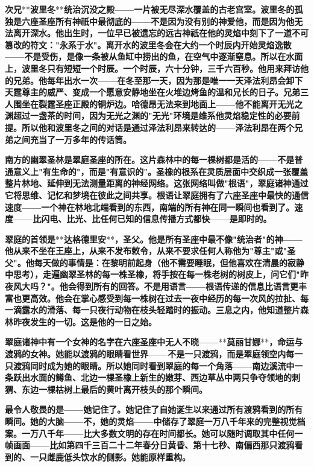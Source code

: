 \documentclass[12pt,a4paper,openany]{ctexbook}
\begin{document}
\textbf{次兄}**\textbf{波里冬}**\textbf{统治沉没之殿——一片被无尽深水覆盖的古老宫室。波里冬的孤独是六座圣座所有神祇中最彻底的——不是因为没有别的神爱他，而是因为他无法离开深水。他出生时，一位早已被遗忘的远古神祇在他的灵焰中刻下了一道不可篡改的符文："永系于水"。离开水的波里冬会在大约一个时辰内开始灵焰逸散——不是受伤，是像一条被从鱼缸中捞出的鱼，在空气中逐渐窒息。所以在水面上，波里冬只有短短一个时辰。一个时辰，六十分钟，三千六百秒。他用来拜访他的兄弟。他每年出水一次——在冬至那一天，因为那是唯一一天泽法利昂会卸下天霆尊主的威严、变成一个愿意安静地坐在火堆边烤鱼的温和兄长的日子。兄弟三人围坐在裂霆圣座正殿的铜炉边。哈德昂无法来到地面上——他不能离开无光之渊超过一盏茶的时间，因为无光之渊的"无光"环境是维系他灵焰稳定性的必要前提。所以他和波里冬之间的对话是通过泽法利昂来转达的——泽法利昂在两个兄弟之间充当了一万多年的传话筒。}


\textbf{南方的幽翠圣林是翠庭圣座的所在。这片森林中的每一棵树都是活的——不是普通意义上"有生命的"，而是"有意识的"。圣橡的根系在灵质层面中交织成一张覆盖整片林地、延伸到无法测量距离的神经网络。这张网络叫做"根语"，翠庭诸神通过它将思维、记忆和梦境在彼此之间共享。根语让翠庭拥有了六座圣座中最快的通信速度——一个神在林地北端看到的东西，南端的所有神在同一瞬间也看到了。速度——比闪电、比光、比任何已知的信息传播方式都快——是即时的。}


\textbf{翠庭的首领是}**\textbf{达格德里安}**\textbf{，圣父。他是所有圣座中最不像"统治者"的神——他从来不坐在王座上，从来不发布敕令，从来不要求任何人称他为"尊主"或"圣父"。他每天做的事情是：在黎明前起身（他不需要睡眠，但他喜欢在清晨的寂静中思考），走遍幽翠圣林的每一株圣橡，将手按在每一株老树的树皮上，问它们"昨夜风大吗？"。他会得到所有的回答。不是用语言——根语传递的信息比语言更丰富也更高效。他会在掌心感受到每一株树在过去一夜中经历的每一次风的拉扯、每一滴露水的滑落、每一只夜行动物在枝头轻踏时的振动。三息之内，他知道整片森林昨夜发生的一切。这是他的一日之始。}


\textbf{翠庭诸神中有一个女神的名字在六座圣座中无人不晓——}**\textbf{莫丽甘娜}**\textbf{，命运与渡鸦的女神。她能以渡鸦的眼睛看世界——不是一只渡鸦，而是翠庭领空内每一只渡鸦同时成为她的眼睛。所以她同时看到翠庭的每一个角落——南边溪流中一条跃出水面的鳟鱼、北边一棵圣橡上新生的嫩芽、西边草丛中两只争夺领地的刺猬、东边一棵枯树上最后的黄叶离开枝头的那个瞬间。}


\textbf{最令人敬畏的是——她记住了。她记住了自她诞生以来通过所有渡鸦看到的所有瞬间。她的大脑——不，她的灵焰——中储存了翠庭一万八千年来的完整视觉档案。一万八千年——比大多数文明的存在时间都长。她可以随时调取其中任何一帧画面——比如第四千三百二十二年春分日黄昏、第十七秒、南偏西那只渡鸦看到的、一只雌鹿低头饮水的侧影。她能原样重构。}
\end{document}
